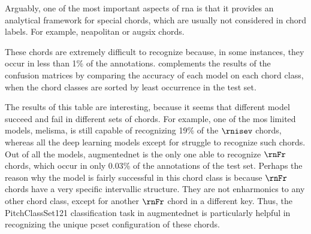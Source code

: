 
Arguably, one of the most important aspects of \gls{rna} is
that it provides an analytical framework for special chords,
which are usually not considered in chord labels. For
example, \gls{neapolitan} or \gls{augsix} chords.

These chords are extremely difficult to recognize because,
in some instances, they occur in less than 1\% of the
annotations.  complements the results of
the confusion matrices by comparing the accuracy of each
model on each chord class, when the chord classes are sorted
by least occurrence in the test set.

The results of this table are interesting, because it seems
that different model succeed and fail in different sets of
chords. For example, one of the mos limited models,
\gls{melisma}, is still capable of recognizing 19\% of the
$\rnisev$ chords, whereas all the deep learning models
except for \textcite{mcleod2021modular} struggle to
recognize such chords. Out of all the models,
\gls{augmentednet} is the only one able to recognize $\rnFr$
chords, which occur in only 0.03\% of the annotations of the
test set. Perhaps the reason why the model is fairly
successful in this chord class is because $\rnFr$ chords
have a very specific intervallic structure. They are not
enharmonics to any other chord class, except for another
$\rnFr$ chord in a different key. Thus, the
\gls{PitchClassSet121} classification task in
\gls{augmentednet} is particularly helpful in recognizing
the unique \gls{pcset} configuration of these chords.


